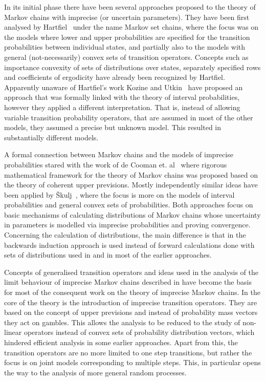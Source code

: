 \documentclass[11pt,dvipsnames,usenames,a4paper]{article}
\begin{document}
In its initial phase there have been several approaches proposed to the theory of Markov chains with imprecise (or uncertain parameters). They have been first analysed by Hartfiel~\cite{hart:98} under the name Markov set chains, where the focus was on the models where lower and upper probabilities are specified for the transition probabilities between individual states, and partially also to the models with general (not-necessarily) convex sets of transition operators. Concepts such as importance convexity of sets of distributions over states, separately specified rows and coefficients of ergodicity have already been recognized by Hartfiel. Apparently unaware of Hartfiel's work Kozine and Utkin~\cite{utkin:2002} have proposed an approach that was formally linked with the theory of interval probabilities, however they applied a different interpretation. That is, instead of allowing variable transition probability operators, that are assumed in most of the other models, they assumed a precise but unknown model. This resulted in substantially different models. 

A formal connection between Markov chains and the models of imprecise probabilities stared with the work of de Cooman et. al~\cite{cooman2008} where rigorous mathematical framework for the theory of Markov chains was proposed based on the theory of coherent upper previsions. Mostly independently similar ideas have been applied by Škulj~\cite{skulj:09}, where the focus is more on the models of interval probabilities and general convex sets of probabilities. Both approaches focus on basic mechanisms of calculating distributions of Markov chains whose uncertainty in parameters is modelled via imprecise probabilities and proving convergence. Concerning the calculation of distributions, the main difference is that in \cite{cooman2008} the backwards induction approach is used instead of forward calculations done with sets of distributions used in \cite{skulj:09} and in most of the earlier approaches. 


Concepts of generalised transition operators and ideas used in the analysis of the limit behaviour of imprecise Markov chains described in \cite{cooman2008} have become the basis for most of the consequent work on the theory of imprecise Markov chains. In the core of the theory is the introduction of imprecise transition operators. They are based on the concept of upper previsions and instead of probability mass vectors they act on gambles. This allows the analysis to be reduced to the study of non-linear operators instead of convex sets of probability distribution vectors, which hindered efficient analysis in some earlier approaches. Apart from this, the transition operators are no more limited to one step transitions, but rather the focus is on joint models corresponding to multiple steps. This, in particular opens the way to the analysis of more general random processes. 
\end{document}
